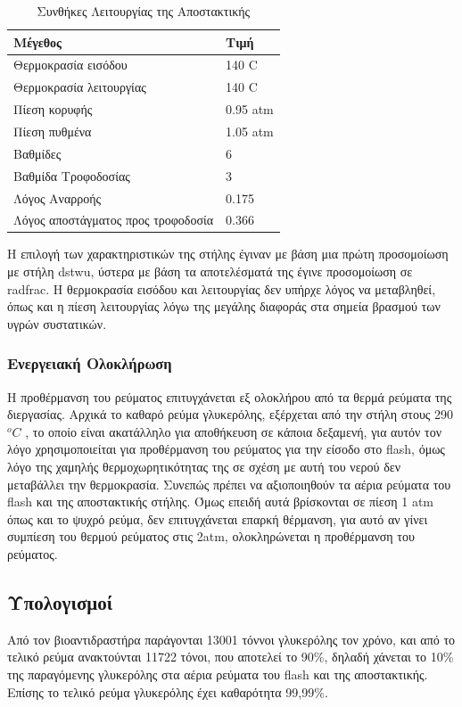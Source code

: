 \documentclass[11pt]{article}
\begin{document}
\begin{table}[htbp]
\caption{Συνθήκες Λειτουργίας της Αποστακτικής}
\centering
\begin{tabular}{ll}
Μέγεθος & Τιμή\\
\hline
Θερμοκρασία εισόδου & 140 C\\
Θερμοκρασία λειτουργίας & 140 C\\
Πίεση κορυφής & 0.95 atm\\
Πίεση πυθμένα & 1.05 atm\\
Βαθμίδες & 6\\
Βαθμίδα Τροφοδοσίας & 3\\
Λόγος Αναρροής & 0.175\\
Λόγος αποστάγματος προς τροφοδοσία & 0.366\\
\end{tabular}
\end{table}

Η επιλογή των χαρακτηριστικών της στήλης έγιναν με βάση μια πρώτη
προσομοίωση με στήλη dstwu, ύστερα με βάση τα αποτελέσματά της έγινε
προσομοίωση σε radfrac. Η θερμοκρασία εισόδου και λειτουργίας δεν υπήρχε
λόγος να μεταβληθεί, όπως και η πίεση λειτουργίας λόγω της μεγάλης
διαφοράς στα σημεία βρασμού των υγρών συστατικών.

\subsubsection{Ενεργειακή Ολοκλήρωση}
\label{sec:org559fb75}
Η προθέρμανση του ρεύματος επιτυγχάνεται εξ ολοκλήρου από τα θερμά
ρεύματα της διεργασίας. Αρχικά το καθαρό ρεύμα γλυκερόλης, εξέρχεται
από την στήλη στους 290\(^{o} C\) , το οποίο είναι ακατάλληλο για
αποθήκευση σε κάποια δεξαμενή, για αυτόν τον λόγο χρησιμοποιείται για
προθέρμανση του ρεύματος για την είσοδο στο flash, όμως λόγο της χαμηλής
θερμοχωρητικότητας της σε σχέση με αυτή του νερού δεν μεταβάλλει την θερμοκρασία. Συνεπώς πρέπει
να αξιοποιηθούν τα αέρια ρεύματα του flash και της αποστακτικής στήλης.
Όμως επειδή αυτά βρίσκονται σε πίεση 1 atm όπως και το ψυχρό ρεύμα, δεν
επιτυγχάνεται επαρκή θέρμανση, για αυτό αν γίνει συμπίεση του θερμού
ρεύματος στις 2atm, ολοκληρώνεται η προθέρμανση του ρεύματος.

\subsection{Υπολογισμοί}
\label{sec:orgf3244d5}
Από τον βιοαντιδραστήρα παράγονται 13001 τόννοι γλυκερόλης τον
χρόνο, και από το τελικό ρεύμα ανακτούνται 11722 τόνοι, που αποτελεί το
90\%, δηλαδή χάνεται το 10\% της παραγόμενης γλυκερόλης στα αέρια
ρεύματα του flash και της αποστακτικής. Επίσης το τελικό ρεύμα
γλυκερόλης έχει καθαρότητα 99,99\%.
\end{document}

